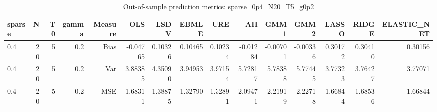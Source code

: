\begin{table}[!htbp]\centering
\caption{Out-of-sample prediction metrics: sparse_0p4_N20_T5_g0p2}
\label{tab:table3_sparse_0p4_N20_T5_g0p2}
\begin{tabular}{lrrrrrrrrrrrrrr}
\hline
sparse & N & T0 & gamma & Measure & OLS & LSDV & EBMLE & URE & AH & GMM1 & GMM2 & LASSO & RIDGE & ELASTIC_NET \\
\hline
0.4 & 20 & 5 & 0.2 & Bias & -0.04765 & 0.10326 & 0.10465 & 0.10234 & -0.01284 & -0.00701 & -0.00336 & 0.30172 & 0.30410 & 0.30156 \\
0.4 & 20 & 5 & 0.2 & Var & 3.88385 & 4.35090 & 3.94953 & 3.97154 & 5.72817 & 5.78388 & 5.77445 & 3.77323 & 3.76427 & 3.77071 \\
0.4 & 20 & 5 & 0.2 & MSE & 1.68311 & 1.38875 & 1.32790 & 1.32891 & 2.09471 & 2.21919 & 2.22718 & 1.66844 & 1.68536 & 1.66844 \\
\hline
\end{tabular}
\end{table}

